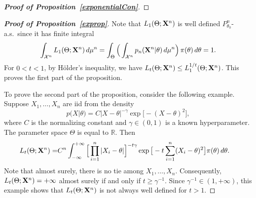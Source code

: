 \documentclass[11pt]{article}
\theoremstyle{plain}
\theoremstyle{definition}
\theoremstyle{remark}
\begin{document}
\begin{appendices}
\begin{proof}[\textbf{Proof of Proposition~\ref{exponentialCon}}]
\end{proof}

\begin{proof}[\textbf{Proof of Proposition~\ref{exprop}}]

Note that $L_1(\Theta;\mathbf{X}^{n})$ is well defined $P_{\theta_0}^n$-a.s.\ since it has finite integral
$$
\int_{\mathcal{X}^n} L_1(\Theta;\mathbf{X}^{n}) \, d\mu^n=
\int_{\Theta}\Big(\int_{\mathcal{X}^n} p_n(\mathbf{X}^{n}|\theta) \, d\mu^n \Big) \, \pi(\theta)\, d\theta=1.
$$
For $0<t<1$, by H\"older's inequality, we have $L_{t}(\Theta;\mathbf{X}^{n})\leq L_1^{1/t}(\Theta;\mathbf{X}^{n})$. This proves the first part of the proposition. 

To prove the second part of the proposition, consider the following example.
Suppose $X_1,\ldots,X_n$ are iid from the density
$$
    p(X|\theta)=C |X-\theta|^{-\gamma}\exp\big[-(X-\theta)^2\big]
,
$$
where $C$ is the normalizing constant and $\gamma\in(0,1)$ is a known hyperparameter. The parameter space $\Theta$ is equal to $\mathbb{R}$.
Then
$$
    \begin{aligned}
        L_t(\Theta;\mathbf{X}^{n})=&
    C^n \int_{-\infty}^{+\infty}
\Big[\prod_{i=1}^n |X_i-\theta|\Big]^{-t\gamma}
    \exp \big[-t\sum_{i=1}^n (X_i-\theta)^2 \big]
        \pi(\theta)
    \,
    d \theta.
    \end{aligned}
$$
Note that almost surely, there is no tie among $X_1,\ldots,X_n$. Consequently, $L_t(\Theta;\mathbf{X}^{n})=+\infty$ almost surely if and only if $t\geq \gamma^{-1}$.
Since $\gamma^{-1}\in (1,+\infty)$, this example shows that $L_t(\Theta;\mathbf{X}^{n})$ is not always well defined for $t>1$.

\end{proof}




\end{appendices}
\end{document}
